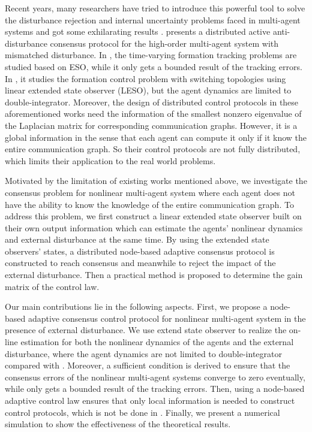 \documentclass[english]{cccconf}
\begin{document}
Recent years, many researchers have tried to introduce this powerful tool to solve the disturbance rejection  and internal uncertainty problems faced in multi-agent systems and got some exhilarating results \cite{XiangyuWangTAC2017,DongCCC2017,Qin2014}. \cite{XiangyuWangTAC2017} presents a distributed active anti-disturbance consensus protocol for the high-order multi-agent system with mismatched disturbance. In \cite{DongCCC2017}, the time-varying formation tracking problems are studied based on ESO, while it only gets a bounded result of the tracking errors. In \cite{Qin2014}, it studies the formation control problem with switching topologies using linear extended state observer (LESO), but the agent dynamics are limited to double-integrator. Moreover, the design of distributed control protocols in these aforementioned works need the information of the smallest nonzero eigenvalue of the Laplacian matrix for corresponding communication graphs. However, it is a global information in the sense that each agent can compute it only if it know the entire communication graph. So their control protocols are not fully distributed, which limits their application to the real world problems. 

Motivated by the limitation of existing works mentioned above, we investigate the consensus problem for nonlinear multi-agent system where each agent does not have the ability to know the knowledge of the entire communication graph. To address this problem, we first construct a linear extended state observer built on their own output information which can estimate the agents' nonlinear dynamics and external disturbance at the same time. By using the extended state observers' states, a distributed node-based adaptive consensus protocol is constructed to reach consensus and meanwhile to reject the impact of the external disturbance. Then a practical method is proposed to determine the gain matrix of the control law.

Our main contributions lie in the following aspects. %
First, we propose a node-based adaptive consensus control protocol for nonlinear multi-agent system in the presence of external disturbance. We use extend state observer to realize the on-line estimation for both the nonlinear dynamics of the agents and the external disturbance, where the agent dynamics are not limited to double-integrator compared with \cite{Qin2014}. Moreover, a sufficient condition is derived to ensure that the consensus errors of the nonlinear multi-agent systems converge to zero eventually, while \cite{DongCCC2017} only gets a bounded result of the tracking errors. Then, using a node-based adaptive control law ensures that only local information is needed to construct control protocols, which is not be done in \cite{XiangyuWangTAC2017,DongCCC2017,Qin2014}.  Finally, we present a numerical simulation to show the effectiveness of the theoretical results.
\end{document}
